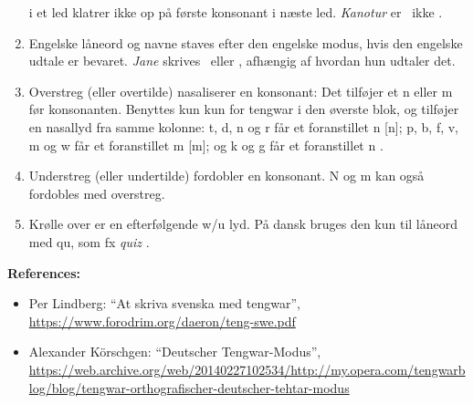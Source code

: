 \documentclass[a4paper]{article}
\begin{document}
\begin{enumerate}
  i et led klatrer ikke op på første konsonant i næste led. \emph{Kanotur} er
  \Tquesse\Tnuumen\TTthreedots\Ttelco\TTrightcurl
  \Ttinco\Toore\TTleftcurl ~ikke
  \Tquesse\Tnuumen\TTthreedots\Ttinco\TTrightcurl\Toore\TTleftcurl.
\item Engelske låneord og navne staves efter den engelske modus, hvis
  den engelske udtale er bevaret.  \emph{Jane} skrives
  \Tanga\Tnuumen\TTthreedots\TTdotbelow ~eller
  \Tanna\Tnuumen\TTthreedots\Ttelco\TTacute, afhængig af hvordan hun
  udtaler det.
\item Overstreg (eller overtilde) nasaliserer en konsonant: Det
  tilføjer et n eller m før konsonanten.  Benyttes kun kun for tengwar
  i den øverste blok, og tilføjer en nasallyd fra samme kolonne: t, d,
  n og r får et foranstillet n [n]; p, b, f, v, m og w får et
  foranstillet m [m]; og k og g får et foranstillet n \textipa{[N]}.
\item Understreg (eller undertilde) fordobler en konsonant.  N og m
  kan også fordobles med overstreg.
\item Krølle over er en efterfølgende w/u lyd.  På dansk bruges den
  kun til låneord med qu, som fx \emph{quiz}
  \Tquesse\TTtilde\Tessenuquerna\TTdot.
\end{enumerate}

{\Large \textbf{References:}\par}
\begin{itemize}
\item Per Lindberg: ``At skriva svenska med tengwar'',
  \url{https://www.forodrim.org/daeron/teng-swe.pdf}
\item Alexander K\"orschgen: ``Deutscher Tengwar-Modus'',\\
  \url{https://web.archive.org/web/20140227102534/http://my.opera.com/tengwarblog/blog/tengwar-orthografischer-deutscher-tehtar-modus}
\end{itemize}
\end{document}
